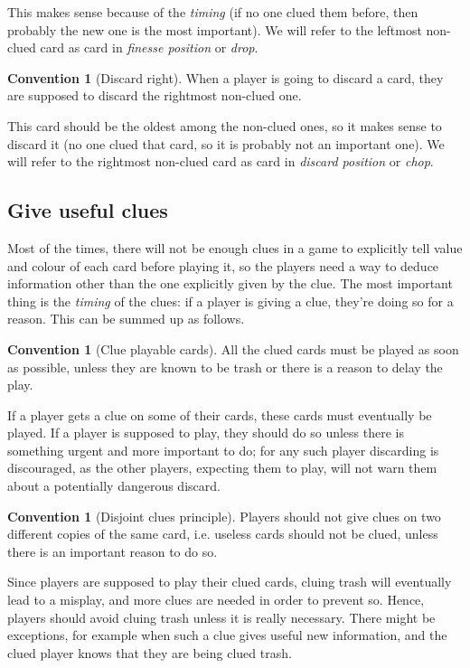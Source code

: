 \documentclass[a4paper]{article}
\theoremstyle{plain}
\theoremstyle{definition}
\newtheorem{convention}[theorem]{Convention}
\begin{document}
This makes sense because of the \emph{timing} (if no one clued them before, then probably the new one is the most important). We will refer to the leftmost non-clued card as card in \emph{finesse position} or \emph{drop}.

\begin{convention}[Discard right]
	\label{discard-right}
	When a player is going to discard a card, they are supposed to discard the rightmost non-clued one.
\end{convention}

This card should be the oldest among the non-clued ones, so it makes sense to discard it (no one clued that card, so it is probably not an important one). We will refer to the rightmost non-clued card as card in \emph{discard position} or \emph{chop}.

\subsection{Give useful clues}

Most of the times, there will not be enough clues in a game to explicitly tell value and colour of each card before playing it, so the players need a way to deduce information other than the one explicitly given by the clue. The most important thing is the \emph{timing} of the clues: if a player is giving a clue, they're doing so for a reason. This can be summed up as follows.

\begin{convention}[Clue playable cards]
	\label{clue-playable-cards}
	All the clued cards must be played as soon as possible, unless they are known to be trash or there is a reason to delay the play.
\end{convention}

If a player gets a clue on some of their cards, these cards must eventually be played. If a player is supposed to play, they should do so unless there is something urgent and more important to do; for any such player discarding is discouraged, as the other players, expecting them to play, will not warn them about a potentially dangerous discard.

\begin{convention}[Disjoint clues principle]
	\label{disjoint-clues}
	Players should not give clues on two different copies of the same card, i.e. useless cards should not be clued, unless there is an important reason to do so.
\end{convention}

Since players are supposed to play their clued cards, cluing trash will eventually lead to a misplay, and more clues are needed in order to prevent so. Hence, players should avoid cluing trash unless it is really necessary. There might be exceptions, for example when such a clue gives useful new information, and the clued player knows that they are being clued trash.
\end{document}
